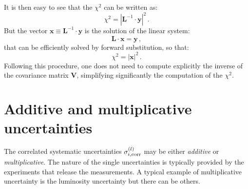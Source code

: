 \documentclass[10pt,a4paper]{article}
\begin{document}
It is then easy to see that the $\chi^2$ can be written as:
\begin{equation}
\chi^2 = \left|\mathbf{L}^{-1}\cdot \mathbf{y}\right|^2\,.
\end{equation}
But the vector $\mathbf{x} \equiv \mathbf{L}^{-1}\cdot \mathbf{y}$ is
the solution of the linear system:
\begin{equation}
  \mathbf{L} \cdot \mathbf{x} = \mathbf{y}\,,
\end{equation}
that can be efficiently solved by forward substitution, so that:
\begin{equation}
  \chi^2 = \left|\mathbf{x}\right|^2\,.
\end{equation}
Following this procedure, one does not need to compute explicitly the
inverse of the covariance matrix $\mathbf{V}$, simplifying
significantly the computation of the $\chi^2$.

\section{Additive and multiplicative uncertainties}

The correlated systematic uncertainties $\sigma_{i,\rm corr}^{(l)}$
may be either \textit{additive} or \textit{multiplicative}. The nature
of the single uncertainties is typically provided by the experiments
that release the measurements. A typical example of multiplicative
uncertainty is the luminosity uncertainty but there can be others.
\end{document}

